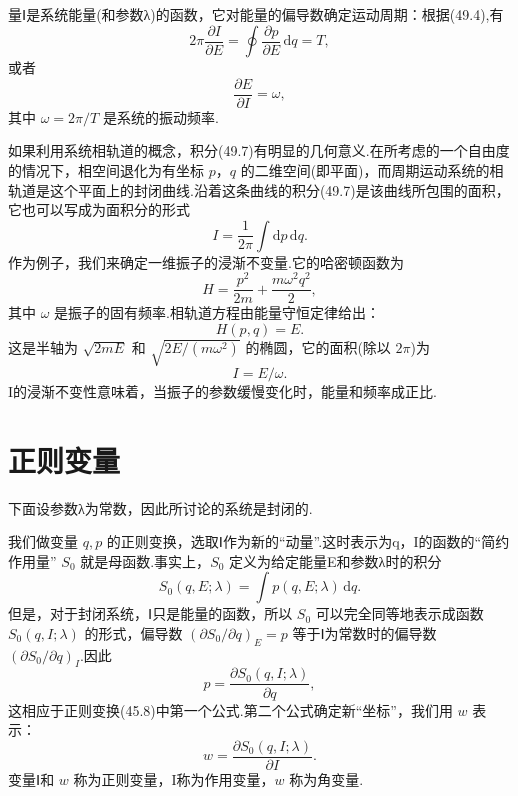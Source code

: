 量Ⅰ是系统能量(和参数λ)的函数，它对能量的偏导数确定运动周期：根据(49.4),有
\begin{equation}
  2\pi\frac{\partial I}{\partial E}
  =\oint\frac{\partial p}{\partial E}\,\mathrm{d}q=T,
\end{equation}
或者
\begin{equation}
  \frac{\partial E}{\partial I}=\omega,
\end{equation}
其中 $\omega=2\pi/T$ 是系统的振动频率.

如果利用系统相轨道的概念，积分(49.7)有明显的几何意义.在所考虑的一个自由度的情况下，相空间退化为有坐标
$p$，$q$
的二维空间(即平面)，而周期运动系统的相轨道是这个平面上的封闭曲线.沿着这条曲线的积分(49.7)是该曲线所包围的面积，它也可以写成为面积分的形式
\begin{equation}
  I=\frac{1}{2\pi}\int\mathrm{d}p\,\mathrm{d}q.
\end{equation}
作为例子，我们来确定一维振子的浸渐不变量.它的哈密顿函数为
\begin{equation}
  H=\frac{p^2}{2m}+\frac{m\omega^2q^2}{2},
\end{equation}
其中 $\omega$
是振子的固有频率.相轨道方程由能量守恒定律给出：
\begin{equation*}
  H(p,q)=E.
\end{equation*}
这是半轴为 $\sqrt{2mE}$ 和 $\sqrt{2E/(m\omega^2)}$
的椭圆，它的面积(除以 $2\pi$)为
\begin{equation}
  I=E/\omega.
\end{equation}
I的浸渐不变性意味着，当振子的参数缓慢变化时，能量和频率成正比.

\section{正则变量}

下面设参数λ为常数，因此所讨论的系统是封闭的.

我们做变量 $q,p$
的正则变换，选取Ⅰ作为新的“动量”.这时表示为q，I的函数的“简约作用量”
$S_0$ 就是母函数.事实上，$S_0$
定义为给定能量E和参数λ时的积分
\begin{equation}
  S_0(q,E;\lambda)=\int p(q,E;\lambda)\,\mathrm{d}q.
\end{equation}
但是，对于封闭系统，Ⅰ只是能量的函数，所以 $S_0$
可以完全同等地表示成函数 $S_0(q,I;\lambda)$
的形式，偏导数 $\left(\partial S_0/\partial q\right)_E=p$
等于Ⅰ为常数时的偏导数 $\left(\partial S_0/\partial q\right)_I$.因此
\begin{equation}
  p=\frac{\partial S_0(q,I;\lambda)}{\partial q},
\end{equation}
这相应于正则变换(45.8)中第一个公式.第二个公式确定新“坐标”，我们用 $w$ 表示：
\begin{equation}
  w=\frac{\partial S_0(q,I;\lambda)}{\partial I}.
\end{equation}
变量Ⅰ和 $w$ 称为正则变量，I称为作用变量，$w$ 称为角变量.


